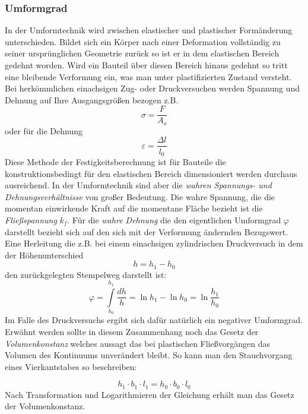 \documentclass[12pt,a4paper,parskip]{scrartcl}
\begin{document}
{\subsubsection{Umformgrad}
In der Umformtechnik wird zwischen elastischer und plastischer Formänderung unterschieden. Bildet sich ein Körper nach einer Deformation vollständig zu seiner ursprünglichen Geometrie zurück so ist er in dem elastischen Bereich gedehnt worden. Wird ein Bauteil über diesen Bereich hinaus gedehnt so tritt eine bleibende Verformung ein, was man unter plastifizierten Zustand versteht.  Bei herkömmlichen einachsigen Zug- oder Druckversuchen werden Spannung und Dehnung auf Ihre Ausgangsgrößen bezogen z.B. \begin{equation}\sigma=\frac{F}{A_o}\end{equation} oder für die Dehnung \begin{equation}\varepsilon = \frac{\Delta l}{l_0}\end{equation} Diese Methode der Festigkeitsberechnung ist für Bauteile die konstruktionsbedingt für den elastischen Bereich dimensioniert werden   durchaus ausreichend. In der Umformtechnik sind aber die \emph{wahren Spannungs- und Dehnungsverhältnisse} von großer Bedeutung. Die wahre Spannung, die die momentan einwirkende Kraft auf die momentane Fläche bezieht ist die \emph{Fließspannung} $ k_f $. Für die \emph{wahre Dehnung} die den eigentlichen Umformgrad $ \varphi $ darstellt bezieht sich auf den sich mit der Verformung ändernden Bezugswert. Eine Herleitung die z.B. bei einem einachsigen zylindrischen Druckversuch in dem der Höhenunterschied \begin{equation}
h=h_1-h_0 \end{equation}  den zurückgelegten Stempelweg darstellt ist:\begin{equation}
\varphi=\int\limits_{h_0}^{h_1}\frac{dh}{h}=\ln h_1 - \ln h_0 = \ln\frac{h_1}{h_0}\end{equation} Im Falle des Druckversuchs ergibt sich dafür natürlich ein negativer Umformgrad. Erwähnt werden sollte in diesem Zusammenhang noch das Gesetz der \emph{Volumenkonstanz} welches aussagt das  bei plastischen Fließvorgängen das Volumen des Kontinuums unverändert bleibt. So kann man den Stauchvorgang eines Vierkantstabes so beschreiben: 






 \begin{equation}h_1 \cdot  b_1 \cdot l_1 = h_0 \cdot b_0 \cdot l_0\end{equation} 
Nach Transformation und Logarithmieren der Gleichung erhält man
das Gesetz der Volumenkonstanz. 
 
}
\end{document}
